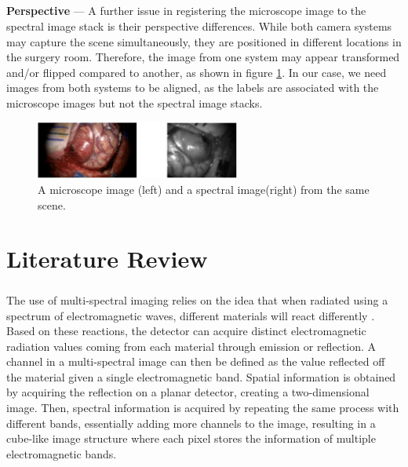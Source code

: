 \documentclass[12pt,oneside]{report}
\begin{document}
\paragraph{}
\textbf{Perspective} --- A further issue in registering the microscope image to the spectral image stack is their perspective differences. While both camera systems may capture the scene simultaneously, they are positioned in different locations in the surgery room. Therefore, the image from one system may appear transformed and/or flipped compared to another, as shown in figure \ref{fig:plain-mic-spec}. In our case, we need images from both systems to be aligned, as the labels are associated with the microscope images but not the spectral image stacks.

\begin{figure}[H]
\centering
\begin{minipage}[h]{\textwidth}
    \centering
    \includegraphics[width=0.6\textwidth]{figures/plain-mic-spec.png}
    \caption{A microscope image (left) and a spectral image(right) from the same scene.}
    \label{fig:plain-mic-spec}
\end{minipage}
\end{figure}

\chapter{Literature Review}

\paragraph{}
The use of multi-spectral imaging relies on the idea that when radiated using a spectrum of electromagnetic waves, different materials will react differently \cite{wu_review_2022}. Based on these reactions, the detector can acquire distinct electromagnetic radiation values coming from each material through emission or reflection. A channel in a multi-spectral image can then be defined as the value reflected off the material given a single electromagnetic band. Spatial information is obtained by acquiring the reflection on a planar detector, creating a two-dimensional image. Then, spectral information is acquired by repeating the same process with different bands, essentially adding more channels to the image, resulting in a cube-like image structure where each pixel stores the information of multiple electromagnetic bands. 
\end{document}
